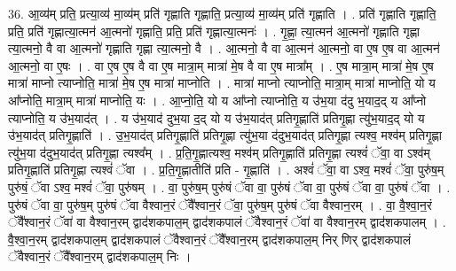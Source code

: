 \documentclass[17pt]{extarticle}
\begin{document}
36. आ॒व्य॑म् प्रति॒ प्रत्या॒व्य॑ मा॒व्य॑म् प्रति॑ गृह्णाति गृह्णाति॒ प्रत्या॒व्य॑ मा॒व्य॑म् प्रति॑ गृह्णाति । . प्रति॑ गृह्णाति गृह्णाति॒ प्रति॒ प्रति॑ गृह्णात्या॒त्मन॑ आ॒त्मनो॑ गृह्णाति॒ प्रति॒ प्रति॑ गृह्णात्या॒त्मनः॑ । . गृ॒ह्णा॒ त्या॒त्मन॑ आ॒त्मनो॑ गृह्णाति गृह्णा त्या॒त्मनो॒ वै वा आ॒त्मनो॑ गृह्णाति गृह्णा त्या॒त्मनो॒ वै । . आ॒त्मनो॒ वै वा आ॒त्मन॑ आ॒त्मनो॒ वा ए॒ष ए॒ष वा आ॒त्मन॑ आ॒त्मनो॒ वा ए॒षः । . वा ए॒ष ए॒ष वै वा ए॒ष मात्रा॒म् मात्रा॑ मे॒ष वै वा ए॒ष मात्रा᳚म् । . ए॒ष मात्रा॒म् मात्रा॑ मे॒ष ए॒ष मात्रा॑ माप्नो त्याप्नोति॒ मात्रा॑ मे॒ष ए॒ष मात्रा॑ माप्नोति । . मात्रा॑ माप्नो त्याप्नोति॒ मात्रा॒म् मात्रा॑ माप्नोति॒ यो य आ᳚प्नोति॒ मात्रा॒म् मात्रा॑ माप्नोति॒ यः । . आ॒प्नो॒ति॒ यो य आ᳚प्नो त्याप्नोति॒ य उ॑भ॒या द॑दु भ॒याद॒द् य आ᳚प्नो त्याप्नोति॒ य उ॑भ॒याद॑त् । . य उ॑भ॒याद॑ दुभ॒या द॒द् यो य उ॑भ॒याद॑त् प्रतिगृ॒ह्णाति॑ प्रतिगृ॒ह्णा त्यु॑भ॒याद॒द् यो य उ॑भ॒याद॑त् प्रतिगृ॒ह्णाति॑ । . उ॒भ॒याद॑त् प्रतिगृ॒ह्णाति॑ प्रतिगृ॒ह्णा त्यु॑भ॒या द॑दुभ॒याद॑त् प्रतिगृ॒ह्णा त्यश्व॒ मश्व॑म् प्रतिगृ॒ह्णा त्यु॑भ॒या द॑दुभ॒याद॑त् प्रतिगृ॒ह्णा त्यश्व᳚म् । . प्र॒ति॒गृ॒ह्णात्यश्व॒ मश्व॑म् प्रतिगृ॒ह्णाति॑ प्रतिगृ॒ह्णा त्यश्वं॑ ॅवा॒ वा ऽश्व॑म् प्रतिगृ॒ह्णाति॑ प्रतिगृ॒ह्णा त्यश्वं॑ ॅवा । . प्र॒ति॒गृ॒ह्णातीति॑ प्रति - गृ॒ह्णाति॑ । . अश्वं॑ ॅवा॒ वा ऽश्व॒ मश्वं॑ ॅवा॒ पुरु॑ष॒म् पुरु॑षं॒ ॅवा ऽश्व॒ मश्वं॑ ॅवा॒ पुरु॑षम् । . वा॒ पुरु॑ष॒म् पुरु॑षं ॅवा वा॒ पुरु॑षं ॅवा वा॒ पुरु॑षं ॅवा वा॒ पुरु॑षं ॅवा । . पुरु॑षं ॅवा वा॒ पुरु॑ष॒म् पुरु॑षं ॅवा वैश्वान॒रं ॅवै᳚श्वान॒रं ॅवा॒ पुरु॑ष॒म् 
पुरु॑षं ॅवा वैश्वान॒रम् । . वा॒ वै॒श्वा॒न॒रं ॅवै᳚श्वान॒रं ॅवा॑ वा वैश्वान॒रम् द्वाद॑शकपाल॒म् द्वाद॑शकपालं ॅवैश्वान॒रं ॅवा॑ वा वैश्वान॒रम् द्वाद॑शकपालम् । . वै॒श्वा॒न॒रम् द्वाद॑शकपाल॒म् द्वाद॑शकपालं ॅवैश्वान॒रं ॅवै᳚श्वान॒रम् द्वाद॑शकपाल॒म् निर् णिर् द्वाद॑शकपालं ॅवैश्वान॒रं ॅवै᳚श्वान॒रम् द्वाद॑शकपाल॒म् निः । \newline
\end{document}
